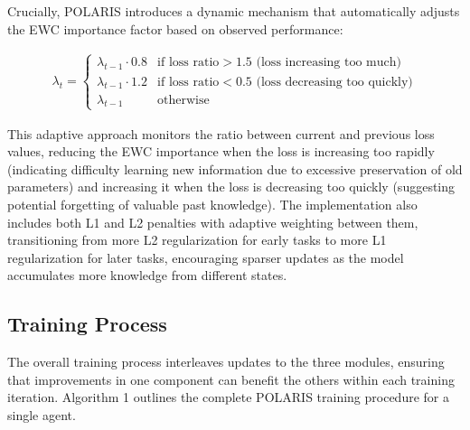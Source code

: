 \documentclass[a4paper,12pt]{report}
\begin{document}
Crucially, POLARIS introduces a dynamic mechanism that automatically adjusts the EWC importance factor based on observed performance:

\begin{align}
    \lambda_t =
    \begin{cases}
        \lambda_{t-1} \cdot 0.8 & \text{if loss ratio} > 1.5 \text{ (loss increasing too much)}    \\
        \lambda_{t-1} \cdot 1.2 & \text{if loss ratio} < 0.5 \text{ (loss decreasing too quickly)} \\
        \lambda_{t-1}           & \text{otherwise}
    \end{cases}
\end{align}

This adaptive approach monitors the ratio between current and previous loss values, reducing the EWC importance when the loss is increasing too rapidly (indicating difficulty learning new information due to excessive preservation of old parameters) and increasing it when the loss is decreasing too quickly (suggesting potential forgetting of valuable past knowledge). The implementation also includes both L1 and L2 penalties with adaptive weighting between them, transitioning from more L2 regularization for early tasks to more L1 regularization for later tasks, encouraging sparser updates as the model accumulates more knowledge from different states.

\subsection{Training Process}

The overall training process interleaves updates to the three modules, ensuring that improvements in one component can benefit the others within each training iteration. Algorithm 1 outlines the complete POLARIS training procedure for a single agent.
\end{document}
